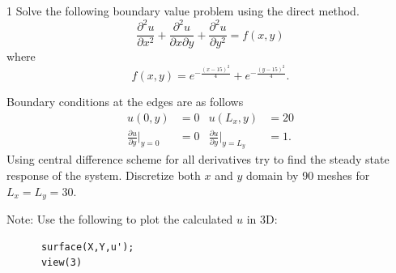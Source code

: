 \newcommand{\NoteType}{Take-Home Exam}
\newcommand{\CourseName}{Numerical Analysis for Engineers}
\newcommand{\CourseNumber}{290211U005}
\newcommand{\TheDate}{May 17, 2026}


  
  \newpage
  \begin{problem}{1}
    Solve the following boundary value problem using the direct method.
    \begin{equation} \label{eq:prob1}
      \frac{\partial^2 u}{\partial x^2}  + \frac{\partial ^2u }{\partial x \partial y} + \frac{\partial ^2 u }{\partial y^2} = f(x,y)
    \end{equation}
    where
    \begin{equation}
      f(x,y) = e^{- \frac{( x-15 )^2}{4}} + e^{ - \frac{(y-15)^2}{4}}
    .\end{equation}
    
    Boundary conditions at the edges are as follows
    \begin{align*}
      u(0,y) &= 0 & u(L_x, y) &= 20 \\
      \frac{\partial u}{\partial y} \bigg|_{y = 0} &= 0 & \frac{\partial u}{\partial y} \bigg|_{y=L_y} &= 1
    .\end{align*}
    Using central difference scheme for all derivatives try to find the steady state response of the system.
    Discretize both $x$ and $y$ domain by 90 meshes for $L_x = L_y = 30$.

    Note: Use the following to plot the calculated $u$ in 3D:
    \begin{verbatim}
      surface(X,Y,u');
      view(3)
    \end{verbatim}
    \vspace{-1.5em}
  \end{problem}

